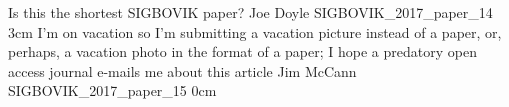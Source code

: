 

\addpaper
	{Is this the shortest SIGBOVIK paper?}
	{Joe Doyle}
	{}
	{SIGBOVIK_2017_paper_14}
	{3cm}
	{}
\addpaper
	{I'm on vacation so I'm submitting a vacation picture instead of a paper, or, perhaps, a vacation photo in the format of a paper; I hope a predatory open access journal e-mails me about this article}
	{Jim McCann}
	{}
	{SIGBOVIK_2017_paper_15}
	{0cm}
	{}

